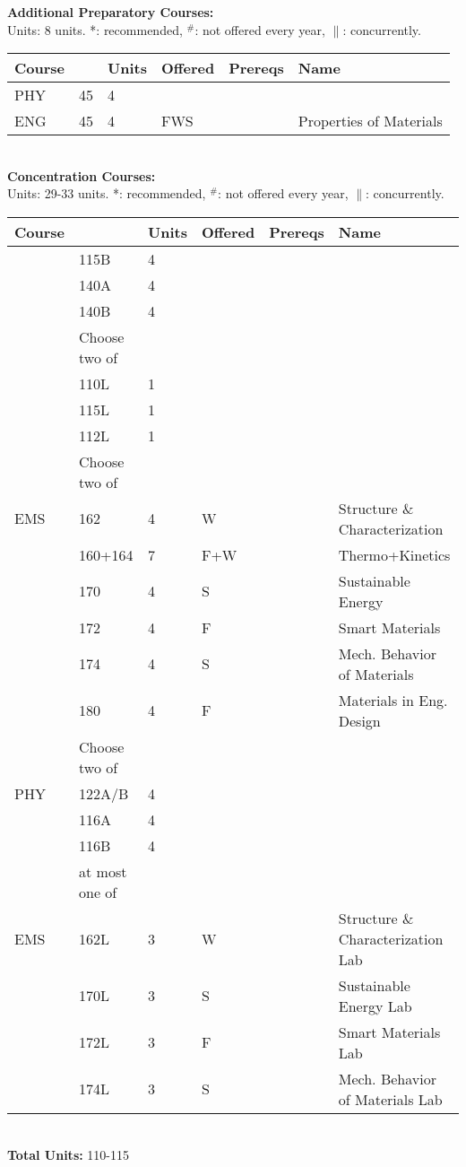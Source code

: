 \documentclass[12pt]{article}
\begin{document}
\newpage
{}
\vskip 0.25cm
\noindent
{\bf Additional Preparatory Courses:  }\\
Units:  8 units. *: recommended, $^\#$: not offered every year, $\parallel$: concurrently.\\
\begin{tabular}{|llllll|}
\hline
Course & & Units & Offered & Prereqs & Name \\
\hline
PHY & 45     & 4 & & & \\
ENG & 45     & 4 & FWS & & Properties of Materials \\
\hline
\end{tabular}\\
\vskip 0.25cm
\noindent
{\bf Concentration Courses:  }\\
Units:  29-33 units. *: recommended, $^\#$: not offered every year, $\parallel$: concurrently.\\
\begin{tabular}{|llllll|}
\hline
Course & & Units & Offered & Prereqs & Name \\
\hline
    & 115B   & 4 & & & \\
    & 140A   & 4 & & & \\
    & 140B   & 4 & & & \\
\hline
\hline
    & Choose two of & & & & \\
\hline
    & 110L & 1 & & & \\
    & 115L & 1 & & & \\
    & 112L & 1 & & & \\
\hline
\hline
    & Choose two of & & & & \\
\hline
EMS & 162     & 4 & W & & Structure \& Characterization \\
    & 160+164 & 7 & F+W & & Thermo+Kinetics \\
    & 170     & 4 & S & & Sustainable Energy \\ 
    & 172     & 4 & F & & Smart Materials \\
    & 174     & 4 & S & & Mech. Behavior of Materials\\
    & 180     & 4 & F & & Materials in Eng. Design\\
\hline
\hline
    & Choose two of & & & & \\
\hline
PHY & 122A/B & 4 & & & \\
    & 116A   & 4 & & & \\
    & 116B   & 4 & & & \\
    & at most one of & & & & \\
EMS & 162L   & 3 & W & & Structure \& Characterization Lab\\
    & 170L   & 3 & S & & Sustainable Energy Lab \\
    & 172L   & 3 & F & & Smart Materials Lab \\
    & 174L   & 3 & S & & Mech. Behavior of Materials Lab \\
\hline
\end{tabular}\\
\noindent
{\bf Total Units:} 110-115 \\
\end{document}

